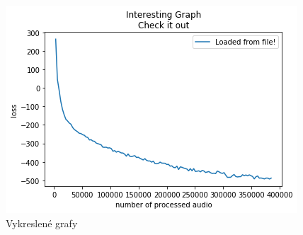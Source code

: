 

\begin{figure}[H]
    \centering
    \includegraphics[scale=0.55]{obrazky-figures/some-loss.png}
    \caption{\label{graf:somelossTODO}Vykreslené grafy}
\end{figure}

